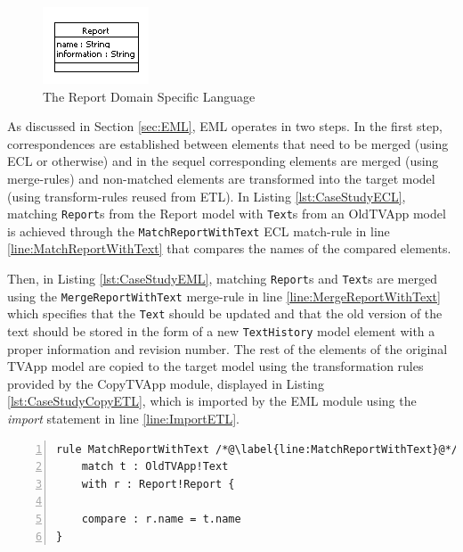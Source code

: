 \begin{figure}
	\centering
		\includegraphics{images/Report}
	\caption{The Report Domain Specific Language}
	\label{fig:Report}
\end{figure}

As discussed in Section \ref{sec:EML}, EML operates in two steps. In the first step, correspondences are established between elements that need to be merged (using ECL or otherwise) and in the sequel corresponding elements are merged (using merge-rules) and non-matched elements are transformed into the target model (using transform-rules reused from ETL). In Listing \ref{lst:CaseStudyECL}, matching \texttt{Report}s from the Report model with \texttt{Text}s from an OldTVApp model is achieved through the \texttt{MatchReportWithText} ECL match-rule in line \ref{line:MatchReportWithText} that compares the names of the compared elements.

Then, in Listing \ref{lst:CaseStudyEML}, matching \texttt{Report}s and \texttt{Text}s are merged using the \texttt{MergeReportWithText} merge-rule in line \ref{line:MergeReportWithText} which specifies that the \texttt{Text} should be updated and that the old version of the text should be stored in the form of a new \texttt{TextHistory} model element with a proper information and revision number. The rest of the elements of the original TVApp model are copied to the target model using the transformation rules provided by the CopyTVApp module, displayed in Listing \ref{lst:CaseStudyCopyETL}, which is imported by the EML module using the \emph{import} statement in line \ref{line:ImportETL}.

\begin{lstlisting}[float=tbp, basicstyle=\ttfamily\footnotesize, flexiblecolumns=true, numbers=left, nolol=true, caption=ECL module that compares a TVApp with a Report model, label=lst:CaseStudyECL, language=ECL, tabsize=2]
rule MatchReportWithText /*@\label{line:MatchReportWithText}@*/
	match t : OldTVApp!Text
	with r : Report!Report {
	
	compare : r.name = t.name	
}
\end{lstlisting}

